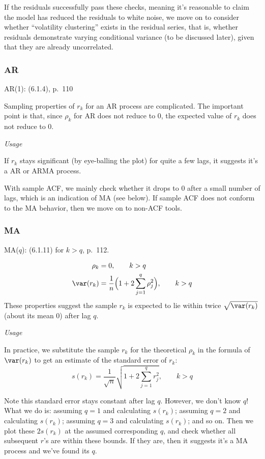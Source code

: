 \documentclass[12pt]{article}
\begin{document}
If the residuals successfully pass these checks,
meaning it's reasonable to claim the model has reduced the residuals
to white noise,
we move on to consider whether ``volatility clustering'' exists in the
residual series, that is,
whether residuals demonstrate varying conditional variance
(to be discussed later),
given that they are already uncorrelated.

\subsubsection{AR}

AR(1): (6.1.4), p.~110

Sampling properties of $r_k$ for an AR process are complicated.
The important point is that,
since $\rho_k$ for AR does not reduce to 0,
the expected value of $r_k$ does not reduce to 0.

\emph{Usage}

If $r_k$ stays significant (by eye-balling the plot)
for quite a few lags, it suggests
it's a AR or ARMA process.

With sample ACF,
we mainly check whether it drops to 0 after a small number of lags,
which is an indication of MA (see below).
If sample ACF does not conform to the MA behavior,
then we move on to non-ACF tools.

\subsubsection{MA}

MA($q$): (6.1.11) for $k > q$, p.~112.

\begin{align*}
\rho_k &= 0, \qquad k > q\\
\var(r_k) &= \frac{1}{n}\Bigl(1 + 2\sum_{j=1}^q \rho_j^2\Bigr), \qquad k>q
\end{align*}
These properties suggest
the sample $r_k$ is expected to lie within twice
$\sqrt{\var(r_k)}$ (about its mean 0)
after lag $q$.

\emph{Usage}

In practice,
we substitute the sample $r_k$ for the theoretical $\rho_k$
in the formula of $\var(r_k)$ to get an estimate
of the standard error of $r_k$:
\[
s(r_k) = \frac{1}{\sqrt{n}} \sqrt{1 + 2 \sum_{j=1}^q r_j^2},
\qquad k>q
\]

Note this standard error stays constant after lag $q$.
However, we don't know $q$!
What we do is:
assuming $q = 1$ and calculating $s(r_k)$;
assuming $q = 2$ and calculating $s(r_k)$;
assuming $q = 3$ and calculating $s(r_k)$;
and so on.
Then we plot these $2s(r_k)$ at the assumed corresponding $q$,
and check whether all subsequent $r$'s are within these bounds.
If they are, then it suggests it's a MA process and we've found its $q$.
\end{document}
